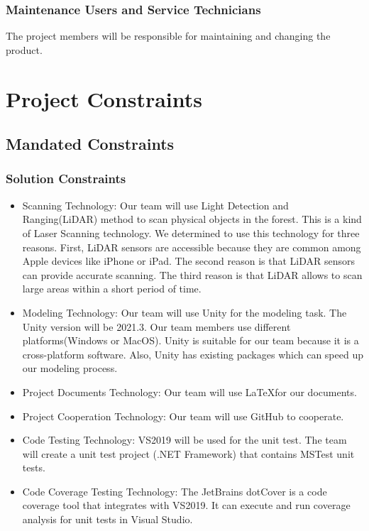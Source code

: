 \documentclass{article}
\begin{document}
\subsubsection{Maintenance Users and Service Technicians}
The project members will be responsible for maintaining and changing the product.


\section{Project Constraints}
\subsection{Mandated Constraints}
\subsubsection{Solution Constraints}
\begin{itemize}
    \item Scanning Technology: Our team will use Light Detection and Ranging(LiDAR) method
    to scan physical objects in the forest. This is a kind of Laser Scanning technology. 
    We determined to use this technology for three reasons. First, LiDAR sensors
    are accessible because they are common among Apple devices like iPhone or iPad. The 
    second reason is that LiDAR sensors can provide accurate scanning. The third reason
    is that LiDAR allows to scan large areas within a short period of time.
    \item Modeling Technology: Our team will use Unity for the modeling task. The Unity version will be 2021.3. Our team members use different platforms(Windows or MacOS). Unity is 
    suitable for our team because it is a cross-platform software. Also, Unity has existing packages which can speed up our modeling process.
    \item Project Documents Technology: Our team will use \LaTeX for our documents.
    \item Project Cooperation Technology: Our team will use GitHub to cooperate.
    \item Code Testing Technology: VS2019 will be used for the unit test. The team will create a unit test project (.NET Framework) that contains MSTest unit tests.
    \item Code Coverage Testing Technology: The JetBrains dotCover is a code coverage tool that integrates with VS2019. It can execute and run coverage analysis for unit tests in Visual Studio.
\end{itemize}
\end{document}

